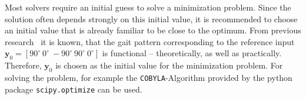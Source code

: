 \documentclass[letterpaper,10pt,conference]{ieeeconf}  %
\begin{document}
Most solvers require an initial guess to solve a minimization problem.
Since the solution often depends strongly on this initial value, it is recommended to choose an initial value that is already familiar to be close to the optimum.
From previous research~\cite{PA_Schiller} it is known, that the gait pattern corresponding to the reference input
$\bm{y}_0=[90^\circ ~ 0^\circ ~ -90^\circ ~ 90^\circ ~ 0^\circ]$
is functional -- theoretically, as well as practically.
Therefore, $\bm{y}_0$ is chosen as the initial value for the minimization problem.
For solving the problem, for example the \texttt{COBYLA}-Algorithm provided by the python package \texttt{scipy.optimize} can be used.





\end{document}
